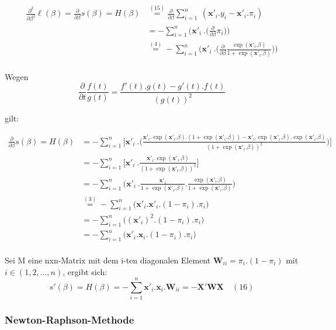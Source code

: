 \documentclass[12pt,]{article}
\begin{document}
\[
\begin{aligned}
\frac{\partial^2}{\partial \beta^2} \ell(\beta) = \frac{\partial}{\partial \beta} s(\beta) = H(\beta) &\mathrel{\overset{(15)}{=}} \frac{\partial}{\partial \beta} \sum_{i = 1}^{n} \ (\mathbf{x'}_i.y_i - \mathbf{x'}_i.\pi_i) \\
&= - \sum_{i = 1}^{n} \Bigg( \mathbf{x'}_i \ .  \Big(\frac{\partial}{\partial \beta} \pi_i \Big) \Bigg) \\
&\mathrel{\overset{(4)}{=}} - \sum_{i = 1}^{n} \Bigg( \mathbf{x'}_i \ .  \Big(\frac{\partial}{\partial \beta} \frac{\exp(\mathbf{x'}_i.\beta)}{1+\exp(\mathbf{x'}_i.\beta)} \Big) \Bigg) \\
\end{aligned}
\]

Wegen \[
\frac{\partial}{\partial t} \frac{f(t)}{g(t)} = \frac{f'(t).g(t) - g'(t).f(t)}{(g(t))^2}
\]

gilt:

\[
\begin{aligned}
\frac{\partial}{\partial \beta} s(\beta) = H(\beta) &= - \sum_{i = 1}^{n} \Bigg[ \mathbf{x'}_i \ . \Bigg( \frac{\mathbf{x'}_i.\exp(\mathbf{x'}_i.\beta).(1+\exp(\mathbf{x'}_i.\beta))-\mathbf{x'}_i.\exp(\mathbf{x'}_i.\beta).\exp(\mathbf{x'}_i.\beta)}{(1+\exp(\mathbf{x'}_i.\beta))^2} \Bigg) \Bigg] \\
&= - \sum_{i = 1}^{n} \Bigg[ \mathbf{x'}_i \ . \frac{\mathbf{x'}_i.\exp(\mathbf{x'}_i.\beta)}{(1+\exp(\mathbf{x'}_i.\beta))^2}  \Bigg] \\
&= - \sum_{i = 1}^{n} \Bigg( \mathbf{x'}_i \ . \frac{\mathbf{x'}_i}{1+\exp(\mathbf{x'}_i.\beta)} . \frac{\exp(\mathbf{x'}_i.\beta)}{1+\exp(\mathbf{x'}_i.\beta)} \Bigg) \\
&\mathrel{\overset{(3)}{=}} - \sum_{i = 1}^{n} \Big( \mathbf{x'}_i . \mathbf{x'}_i . (1-\pi_i) . \pi_i \Big) \\
&= - \sum_{i = 1}^{n} \Big( (\mathbf{x'}_i)^2 . (1-\pi_i) . \pi_i \Big) \\
&= - \sum_{i = 1}^{n} \Big( \mathbf{x'}_i.\mathbf{x}_i . (1-\pi_i) . \pi_i \Big) \quad \\
\end{aligned}
\]

Sei M eine nxn-Matrix mit dem i-ten diagonalen Element
\(\mathbf{W}_{ii} = \pi_i.(1-\pi_i)\) mit \(i \in (1,2,...,n)\), ergibt
sich: \[
s'(\beta) = H(\beta) = - \sum_{i = 1}^{n} \mathbf{x'}_i.\mathbf{x}_i . \mathbf{W}_{ii} = - \mathbf{X}'\mathbf{W}\mathbf{X} \quad (16)
\]

\subsubsection{Newton-Raphson-Methode}\label{newton-raphson-methode}
\end{document}
